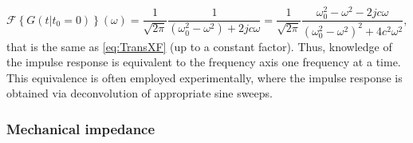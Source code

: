 \begin{equation}
    \mathcal{F}\left\{G(t|t_0=0)\right\}(\omega) = \frac{1}{\sqrt{2\pi}}\frac{1}{(\omega_0^2-\omega^2)+2jc\omega} = \frac{1}{\sqrt{2\pi}}\frac{\omega_0^2-\omega^2-2jc\omega}{(\omega_0^2-\omega^2)^2+4c^2\omega^2},
\end{equation}
that is the same as \eqref{eq:TransXF} (up to a constant factor). Thus, knowledge of the impulse response is equivalent to  the frequency axis one frequency at a time. This equivalence is often employed experimentally, where the impulse response is obtained via deconvolution of appropriate sine sweeps.


\subsubsection{Mechanical impedance}

